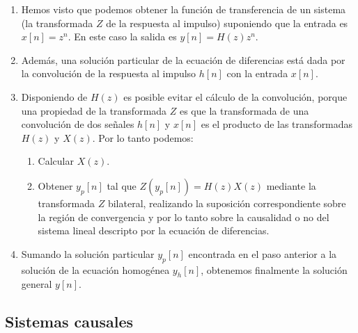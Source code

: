 \begin{enumerate}

\item Hemos visto que podemos obtener la funci\'{o}n de transferencia de un sistema 
(la transformada $Z$ de la respuesta al impulso) suponiendo que la entrada es $x[n] = z^{n}$. 
En este caso la salida es $y[n] = H(z) z^{n}$.

\item Adem\'{a}s, una soluci\'{o}n particular de la ecuaci\'{o}n de diferencias 
est\'{a} dada por la convoluci\'{o}n de la respuesta al impulso $h[n]$ con la 
entrada $x[n]$. 

\item Disponiendo de $H(z)$ es posible evitar el c\'{a}lculo de la convoluci\'{o}n, 
porque una propiedad de la transformada $Z$ es que la transformada de una 
convoluci\'{o}n de dos se\~{n}ales $h[n]$ y $x[n]$ es el producto de las 
transformadas $H(z)$ y $X(z)$. Por lo tanto podemos:
\begin{enumerate}
   \item Calcular $X(z)$.
   \item Obtener $y_{p}[n]$ tal que $Z(y_{p}[n]) = H(z) X(z)$ mediante la 
     transformada $Z$ bilateral, realizando la suposici\'{o}n correspondiente 
     sobre la regi\'{o}n de convergencia y por lo tanto sobre la causalidad o no 
     del sistema lineal descripto por la ecuaci\'{o}n de diferencias.
\end{enumerate}

\item Sumando la soluci\'{o}n particular $y_{p}[n]$ encontrada en el paso anterior a 
  la soluci\'{o}n de la ecuaci\'{o}n homog\'{e}nea $y_{h}[n]$, obtenemos finalmente 
  la soluci\'{o}n general $y[n]$.

\end{enumerate}

\subsection{Sistemas causales}

